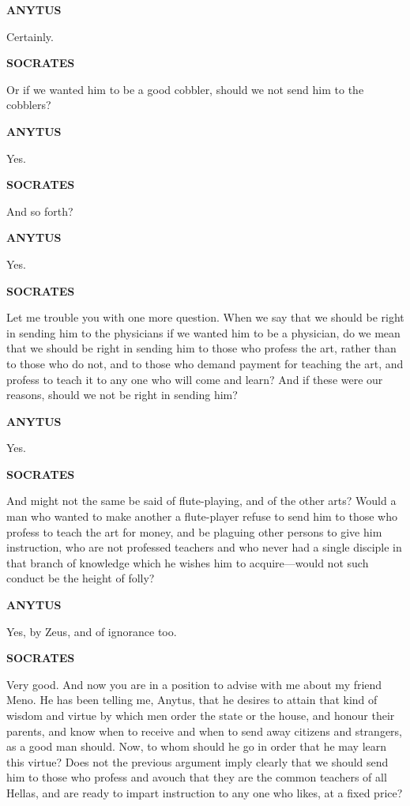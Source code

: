 \documentclass[11pt,letter]{article}
\begin{document}
\par \textbf{ANYTUS}
\par   Certainly.

\par \textbf{SOCRATES}
\par   Or if we wanted him to be a good cobbler, should we not send him to the cobblers?

\par \textbf{ANYTUS}
\par   Yes.

\par \textbf{SOCRATES}
\par   And so forth?

\par \textbf{ANYTUS}
\par   Yes.

\par \textbf{SOCRATES}
\par   Let me trouble you with one more question. When we say that we should be right in sending him to the physicians if we wanted him to be a physician, do we mean that we should be right in sending him to those who profess the art, rather than to those who do not, and to those who demand payment for teaching the art, and profess to teach it to any one who will come and learn? And if these were our reasons, should we not be right in sending him?

\par \textbf{ANYTUS}
\par   Yes.

\par \textbf{SOCRATES}
\par   And might not the same be said of flute-playing, and of the other arts? Would a man who wanted to make another a flute-player refuse to send him to those who profess to teach the art for money, and be plaguing other persons to give him instruction, who are not professed teachers and who never had a single disciple in that branch of knowledge which he wishes him to acquire—would not such conduct be the height of folly?

\par \textbf{ANYTUS}
\par   Yes, by Zeus, and of ignorance too.

\par \textbf{SOCRATES}
\par   Very good. And now you are in a position to advise with me about my friend Meno. He has been telling me, Anytus, that he desires to attain that kind of wisdom and virtue by which men order the state or the house, and honour their parents, and know when to receive and when to send away citizens and strangers, as a good man should. Now, to whom should he go in order that he may learn this virtue? Does not the previous argument imply clearly that we should send him to those who profess and avouch that they are the common teachers of all Hellas, and are ready to impart instruction to any one who likes, at a fixed price?
\end{document}
